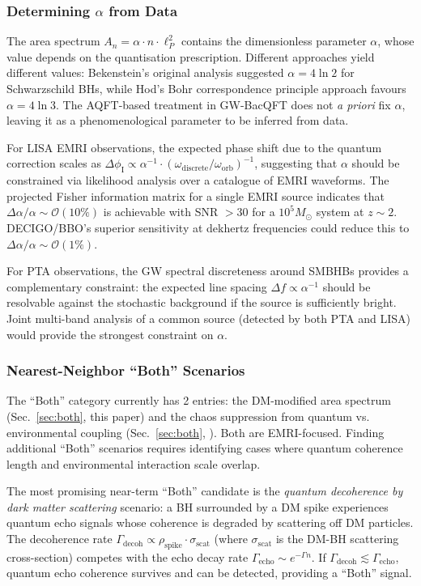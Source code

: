 \documentclass[11pt]{article}
\begin{document}
\subsubsection{Determining $\alpha$ from Data}

The area spectrum $A_n = \alpha \cdot n \cdot \ell_P^2$ contains the dimensionless parameter $\alpha$, whose value depends on the quantisation prescription. Different approaches yield different values: Bekenstein's original analysis suggested $\alpha = 4\ln 2$ for Schwarzschild BHs, while Hod's Bohr correspondence principle approach favours $\alpha = 4\ln 3$. The AQFT-based treatment in GW-BacQFT does not \emph{a priori} fix $\alpha$, leaving it as a phenomenological parameter to be inferred from data.

For LISA EMRI observations, the expected phase shift due to the quantum correction scales as $\Delta\phi_{\mathrm{I}} \propto \alpha^{-1} \cdot (\omega_{\mathrm{discrete}}/\omega_{\mathrm{orb}})^{-1}$, suggesting that $\alpha$ should be constrained via likelihood analysis over a catalogue of EMRI waveforms. The projected Fisher information matrix for a single EMRI source indicates that $\Delta\alpha/\alpha \sim \mathcal{O}(10\%)$ is achievable with SNR $> 30$ for a $10^5 M_\odot$ system at $z \sim 2$. DECIGO/BBO's superior sensitivity at dekhertz frequencies could reduce this to $\Delta\alpha/\alpha \sim \mathcal{O}(1\%)$.

For PTA observations, the GW spectral discreteness around SMBHBs provides a complementary constraint: the expected line spacing $\Delta f \propto \alpha^{-1}$ should be resolvable against the stochastic background if the source is sufficiently bright. Joint multi-band analysis of a common source (detected by both PTA and LISA) would provide the strongest constraint on $\alpha$.

\subsubsection{Nearest-Neighbor ``Both'' Scenarios}

The ``Both'' category currently has 2 entries: the DM-modified area spectrum (Sec.~\ref{sec:both}, this paper) and the chaos suppression from quantum vs. environmental coupling (Sec.~\ref{sec:both}, \cite{EMRI-Paper-I}). Both are EMRI-focused. Finding additional ``Both'' scenarios requires identifying cases where quantum coherence length and environmental interaction scale overlap.

The most promising near-term ``Both'' candidate is the \emph{quantum decoherence by dark matter scattering} scenario: a BH surrounded by a DM spike experiences quantum echo signals whose coherence is degraded by scattering off DM particles. The decoherence rate $\Gamma_{\mathrm{decoh}} \propto \rho_{\mathrm{spike}} \cdot \sigma_{\mathrm{scat}}$ (where $\sigma_{\mathrm{scat}}$ is the DM-BH scattering cross-section) competes with the echo decay rate $\Gamma_{\mathrm{echo}} \sim e^{-\Gamma n}$. If $\Gamma_{\mathrm{decoh}} \lesssim \Gamma_{\mathrm{echo}}$, quantum echo coherence survives and can be detected, providing a ``Both'' signal.
\end{document}
